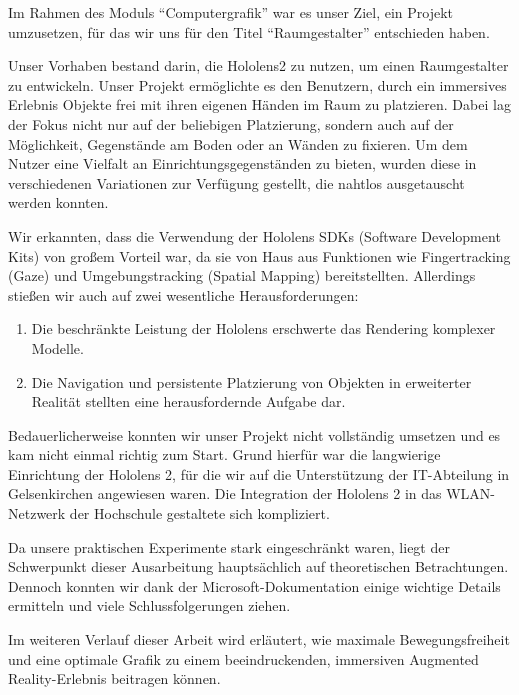 Im Rahmen des Moduls \enquote{Computergrafik} war es unser Ziel, ein Projekt umzusetzen, für das wir uns für den Titel \enquote{Raumgestalter} entschieden haben.

Unser Vorhaben bestand darin, die Hololens2 zu nutzen, um einen Raumgestalter zu entwickeln.
Unser Projekt ermöglichte es den Benutzern, durch ein immersives Erlebnis Objekte frei mit ihren eigenen Händen im Raum zu platzieren.
Dabei lag der Fokus nicht nur auf der beliebigen Platzierung, sondern auch auf der Möglichkeit, Gegenstände am Boden oder an Wänden zu fixieren.
Um dem Nutzer eine Vielfalt an Einrichtungsgegenständen zu bieten, wurden diese in verschiedenen Variationen zur Verfügung gestellt, die nahtlos ausgetauscht werden konnten.

Wir erkannten, dass die Verwendung der Hololens SDKs (Software Development Kits) von großem Vorteil war, da sie von Haus aus Funktionen wie Fingertracking (Gaze) und Umgebungstracking (Spatial Mapping) bereitstellten.
Allerdings stießen wir auch auf zwei wesentliche Herausforderungen:

\begin{enumerate}
    \item Die beschränkte Leistung der Hololens erschwerte das Rendering komplexer Modelle.
    \item Die Navigation und persistente Platzierung von Objekten in erweiterter Realität stellten eine herausfordernde Aufgabe dar.
\end{enumerate}

Bedauerlicherweise konnten wir unser Projekt nicht vollständig umsetzen und es kam nicht einmal richtig zum Start.
Grund hierfür war die langwierige Einrichtung der Hololens 2, für die wir auf die Unterstützung der IT-Abteilung in Gelsenkirchen angewiesen waren.
Die Integration der Hololens 2 in das WLAN-Netzwerk der Hochschule gestaltete sich kompliziert.

Da unsere praktischen Experimente stark eingeschränkt waren, liegt der Schwerpunkt dieser Ausarbeitung hauptsächlich auf theoretischen Betrachtungen.
Dennoch konnten wir dank der Microsoft-Dokumentation einige wichtige Details ermitteln und viele Schlussfolgerungen ziehen.

Im weiteren Verlauf dieser Arbeit wird erläutert, wie maximale Bewegungsfreiheit und eine optimale Grafik zu einem beeindruckenden, immersiven Augmented Reality-Erlebnis beitragen können.

